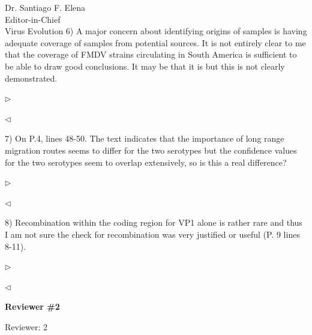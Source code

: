 \documentclass[ucla,biomath,12pt,noaddrfooter,datefrom]{UC_letter}
\newenvironment{reply}{$\triangleright$\bf}{$\triangleleft$}
\begin{document}
\begin{letter}{
Dr. Santiago F. Elena \\
Editor-in-Chief \\
Virus Evolution
}
6)      A major concern about identifying origins of samples is having adequate coverage of samples from potential sources. 
It is not entirely clear to me that the coverage of FMDV strains circulating in South America is sufficient to be able to draw good conclusions. 
It may be that it is but this is not clearly demonstrated.

\begin{reply}

\end{reply}

7)      On P.4, lines 48-50. The text indicates that the importance of long range migration routes seems to differ for the two serotypes but the confidence values for the two serotypes seem to overlap extensively, so is this a real difference?

\begin{reply}

\end{reply}

8)      Recombination within the coding region for VP1 alone is rather rare and thus I am not sure the check for recombination was very justified or useful (P. 9 lines 8-11).

\begin{reply}

\end{reply}


\textbf{Reviewer \#2}

Reviewer: 2


\end{letter}
\end{document}
